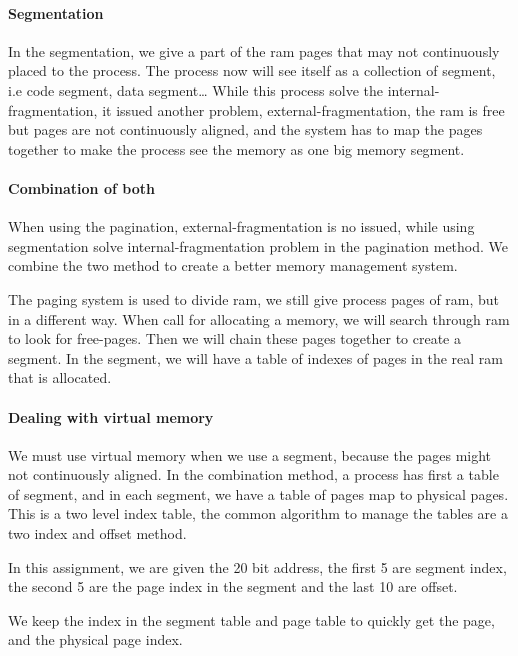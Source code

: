 \documentclass[]{article}
\let\oldparagraph\paragraph
\renewcommand{\paragraph}[1]{\oldparagraph{#1}\mbox{}}
\begin{document}
\paragraph{Segmentation}\label{segmentation}

In the segmentation, we give a part of the ram pages that may not
continuously placed to the process. The process now will see itself as a
collection of segment, i.e code segment, data segment\ldots{} While this
process solve the internal-fragmentation, it issued another problem,
external-fragmentation, the ram is free but pages are not continuously
aligned, and the system has to map the pages together to make the
process see the memory as one big memory segment.

\paragraph{Combination of both}\label{combination-of-both}

When using the pagination, external-fragmentation is no issued, while
using segmentation solve internal-fragmentation problem in the
pagination method. We combine the two method to create a better memory
management system.

The paging system is used to divide ram, we still give process pages of
ram, but in a different way. When call for allocating a memory, we will
search through ram to look for free-pages. Then we will chain these
pages together to create a segment. In the segment, we will have a table
of indexes of pages in the real ram that is allocated.

\paragraph{Dealing with virtual
memory}\label{dealing-with-virtual-memory}

We must use virtual memory when we use a segment, because the pages
might not continuously aligned. In the combination method, a process has
first a table of segment, and in each segment, we have a table of pages
map to physical pages. This is a two level index table, the common
algorithm to manage the tables are a two index and offset method.

In this assignment, we are given the 20 bit address, the first 5 are
segment index, the second 5 are the page index in the segment and the
last 10 are offset.

We keep the index in the segment table and page table to quickly get the
page, and the physical page index.
\end{document}
